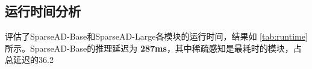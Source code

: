 \subsection{运行时间分析}



评估了SparseAD-Base和SparseAD-Large各模块的运行时间，结果如 \cref{tab:runtime} 所示。SparseAD-Base的推理延迟为 \textbf{287ms}，其中稀疏感知是最耗时的模块，占总延迟的36.2%
